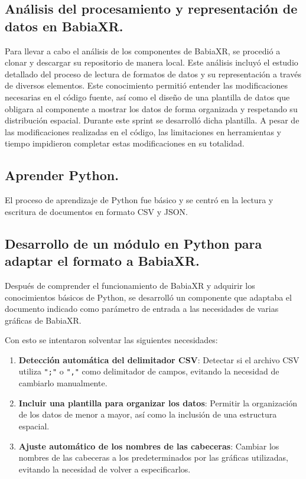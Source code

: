 \documentclass[a4paper, 12pt]{book}
\begin{document}
\vspace{\baselineskip}      
\subsection{Análisis del procesamiento y representación de datos en BabiaXR.}

Para llevar a cabo el análisis de los componentes de BabiaXR, se procedió a clonar y descargar su repositorio de manera local. Este análisis incluyó el estudio detallado del proceso de lectura de formatos de datos y su representación a través de diversos elementos. Este conocimiento permitió entender las modificaciones necesarias en el código fuente, así como el diseño de una plantilla de datos que obligara al componente a mostrar los datos de forma organizada y respetando su distribución espacial. Durante este sprint se desarrolló dicha plantilla. A pesar de las modificaciones realizadas en el código, las limitaciones en herramientas y tiempo impidieron completar estas modificaciones en su totalidad.


  \vspace{\baselineskip}      
        \subsection{Aprender Python.}
        
        El proceso de aprendizaje de Python fue básico y se centró en la lectura y escritura de documentos en formato CSV y JSON.


       \vspace{\baselineskip}
        \subsection{Desarrollo de un módulo en Python para adaptar el formato a BabiaXR.}
        
        Después de comprender el funcionamiento de BabiaXR y adquirir los conocimientos básicos de Python, se desarrolló un componente que adaptaba el documento indicado como parámetro de entrada a las necesidades de varias gráficas de BabiaXR.


        Con esto se intentaron solventar las siguientes necesidades:
        
        \begin{enumerate}
            \item \textbf{Detección automática del delimitador CSV}: Detectar si el archivo CSV utiliza \texttt{";"} o \texttt{","} como delimitador de campos, evitando la necesidad de cambiarlo manualmente.  
            \item \textbf{Incluir una plantilla para organizar los datos}: Permitir la organización de los datos de menor a mayor, así como la inclusión de una estructura espacial. 
        
            \item \textbf{Ajuste automático de los nombres de las cabeceras}: Cambiar los nombres de las cabeceras a los predeterminados por las gráficas utilizadas, evitando la necesidad de volver a especificarlos.
        \end{enumerate}
\end{document}
